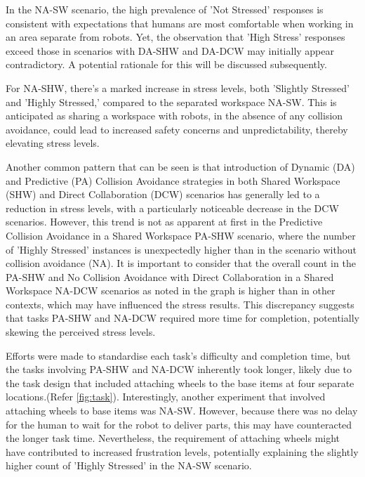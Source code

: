 In the \gls{NA-SW} scenario, the high prevalence of 'Not Stressed' responses is consistent with expectations that humans are most comfortable when working in an area separate from robots. Yet, the observation that 'High Stress' responses exceed those in scenarios with \gls{DA-SHW} and \gls{DA-DCW} may initially appear contradictory. A potential rationale for this will be discussed subsequently.

For \gls{NA-SHW}, there's a marked increase in stress levels, both 'Slightly Stressed' and 'Highly Stressed,' compared to the separated workspace \gls{NA-SW}. This is anticipated as sharing a workspace with robots, in the absence of any collision avoidance, could lead to increased safety concerns and unpredictability, thereby elevating stress levels.

Another common pattern that can be seen is that introduction of Dynamic (DA) and Predictive (PA) Collision Avoidance strategies in both Shared Workspace (SHW) and Direct Collaboration (DCW) scenarios has generally led to a reduction in stress levels, with a particularly noticeable decrease in the DCW scenarios. However, this trend is not as apparent at first in the Predictive Collision Avoidance in a Shared Workspace \gls{PA-SHW} scenario, where the number of 'Highly Stressed' instances is unexpectedly higher than in the scenario without collision avoidance (NA). It is important to consider that the overall count in the PA-SHW and No Collision Avoidance with Direct Collaboration in a Shared Workspace \gls{NA-DCW} scenarios as noted in the graph  is higher than in other contexts, which may have influenced the stress results.
This discrepancy suggests that tasks PA-SHW and NA-DCW required more time for completion, potentially skewing the perceived stress levels.

Efforts were made to standardise each task's difficulty and completion time, but the tasks involving \gls{PA-SHW} and \gls{NA-DCW} inherently took longer, likely due to the task design that included attaching wheels to the base items at four separate locations.(Refer \autoref{fig:task}). 
Interestingly, another experiment that involved attaching wheels to base items was NA-SW. However, because there was no delay for the human to wait for the robot to deliver parts, this may have counteracted the longer task time. Nevertheless, the requirement of attaching wheels might have contributed to increased frustration levels, potentially explaining the slightly higher count of 'Highly Stressed' in the NA-SW scenario.

